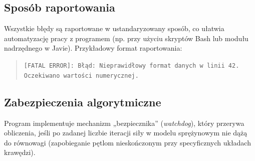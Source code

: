 \documentclass[12pt,a4paper]{article}
\begin{document}
\subsection{Sposób raportowania}

Wszystkie błędy są raportowane w ustandaryzowany sposób, co ułatwia automatyzację pracy z programem (np. przy użyciu skryptów Bash lub modułu nadrzędnego w Javie). Przykładowy format raportowania:

\begin{quote}
    \texttt{[FATAL ERROR]: Błąd: Nieprawidłowy format danych w linii 42. Oczekiwano wartości numerycznej.}
\end{quote}

\subsection{Zabezpieczenia algorytmiczne}
Program implementuje mechanizm „bezpiecznika” (\textit{watchdog}), który przerywa obliczenia, jeśli po zadanej liczbie iteracji siły w modelu sprężynowym nie dążą do równowagi (zapobieganie pętlom nieskończonym przy specyficznych układach krawędzi).
\end{document}
